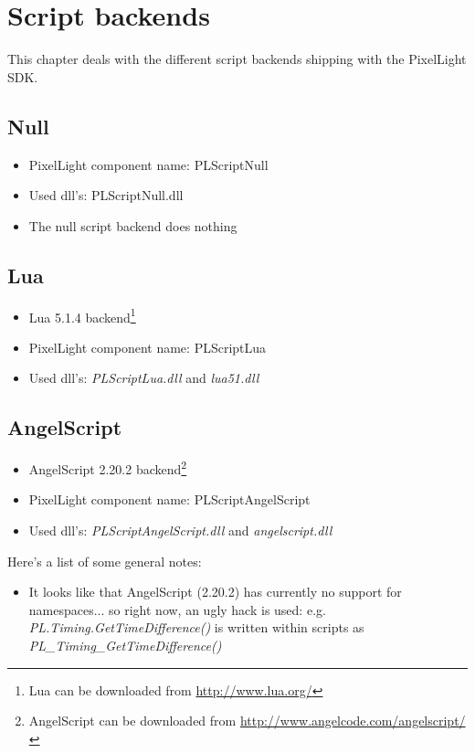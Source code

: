 \chapter{Script backends}
This chapter deals with the different script backends shipping with the PixelLight SDK.




\section{Null}
\begin{itemize}
\item PixelLight component name: PLScriptNull
\item Used dll's: PLScriptNull.dll
\item The null script backend does nothing
\end{itemize}




\section{Lua}
\begin{itemize}
\item Lua 5.1.4 backend\footnote{Lua can be downloaded from \url{http://www.lua.org/}}
\item PixelLight component name: PLScriptLua
\item Used dll's: \emph{PLScriptLua.dll} and \emph{lua51.dll}
\end{itemize}




\section{AngelScript}
\begin{itemize}
\item AngelScript 2.20.2 backend\footnote{AngelScript can be downloaded from \url{http://www.angelcode.com/angelscript/}}
\item PixelLight component name: PLScriptAngelScript
\item Used dll's: \emph{PLScriptAngelScript.dll} and \emph{angelscript.dll}
\end{itemize}

Here's a list of some general notes:
\begin{itemize}
\item It looks like that AngelScript (2.20.2) has currently no support for namespaces... so right now, an ugly hack is used: e.g. \emph{PL.Timing.GetTimeDifference()} is written within scripts as \emph{PL\_Timing\_GetTimeDifference()}
\end{itemize}




